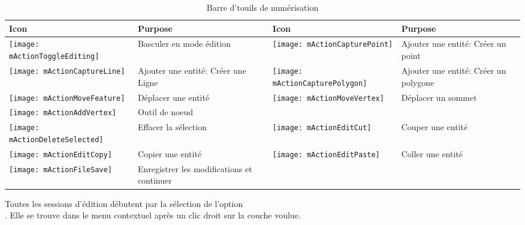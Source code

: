 \begin{table}[ht]
\centering

\begin{tabular}{|l|p{5.5cm}|l|p{5.5cm}|}
\hline \textbf{Icon} & \textbf{Purpose} & \textbf{Icon} & \textbf{Purpose} \\
\hline \texttt{[image: mActionToggleEditing]}
   & Basculer en mode édition
   & \texttt{[image: mActionCapturePoint]}
   & Ajouter une entité: Créer un point \\
\hline \texttt{[image: mActionCaptureLine]}
   & Ajouter une entité: Créer une Ligne
   & \texttt{[image: mActionCapturePolygon]}
   & Ajouter une entité: Créer un polygone \\
\hline \texttt{[image: mActionMoveFeature]}
   & Déplacer une entité
   & \texttt{[image: mActionMoveVertex]}
   & Déplacer un sommet\\
\hline \texttt{[image: mActionAddVertex]}
   & Outil de noeud \\
\hline \texttt{[image: mActionDeleteSelected]}
   & Effacer la sélection
   & \texttt{[image: mActionEditCut]}
   & Couper une entité \\
\hline \texttt{[image: mActionEditCopy]}
   & Copier une entité 
   & \texttt{[image: mActionEditPaste]} 
   & Coller une entité \\
\hline \texttt{[image: mActionFileSave]}
   & Enregistrer les modifications et continuer
   &  &  \\
\hline
\end{tabular}
\caption{Barre d'touils de numérisation}\label{tab:vector_editing}
\end{table}


Toutes les sessions d'édition débutent par la sélection de l'option\\ 
. Elle se trouve 
dans le menu contextuel après un clic droit sur la couche voulue.


